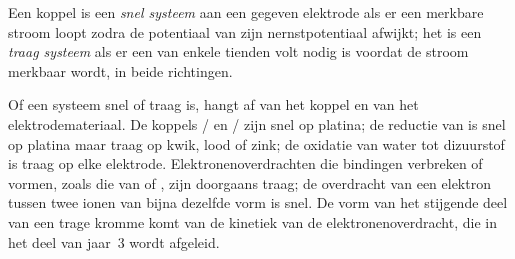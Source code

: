 \begin{definition}\label{def:b2:current-potential-curves:fast-slow}
Een koppel is een \emph{snel systeem} aan een gegeven elektrode als er een
merkbare stroom loopt zodra de potentiaal van zijn nernstpotentiaal afwijkt;
het is een \emph{traag systeem} als er een  van
enkele tienden volt nodig is voordat de stroom merkbaar wordt, in
beide richtingen.
\end{definition}

Of een systeem snel of traag is, hangt af van het koppel en van het
elektrodemateriaal. De koppels / en / zijn snel op
platina; de reductie van  is snel op platina maar traag op kwik,
lood of zink; de oxidatie van water tot dizuurstof is traag op elke elektrode.
Elektronenoverdrachten die bindingen verbreken of vormen, zoals die van  of ,
zijn doorgaans traag; de overdracht van een elektron tussen twee ionen van bijna
dezelfde vorm is snel. De vorm van het stijgende deel van een trage kromme komt van
de kinetiek van de elektronenoverdracht, die in het deel van jaar~3 wordt afgeleid.

